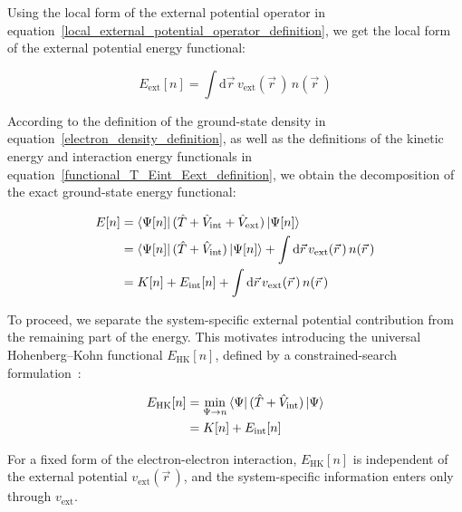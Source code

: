 Using the local form of the external potential operator in equation~\eqref{local_external_potential_operator_definition}, we get the local form of the external potential energy functional:

\begin{equation}
    E_\mathrm{ext}[n]=\int\mathrm{d}\vec{r}\,v_\mathrm{ext}(\vec{r}\,)\,n(\vec{r}\,)
\label{functional_Eext_local_form}
\end{equation}

According to the definition of the ground-state density in equation~\eqref{electron_density_definition},
as well as the definitions of the kinetic energy and interaction energy functionals in equation~\eqref{functional_T_Eint_Eext_definition},
we obtain the decomposition of the exact ground-state energy functional:

\begin{equation}
\begin{aligned}
E[n]
&= \bra{\Psi[n]}(\hat{T}+\hat{V}_\mathrm{int}+\hat{V}_\mathrm{ext})\ket{\Psi[n]} \\
&= \bra{\Psi[n]}(\hat{T}+\hat{V}_\mathrm{int})\ket{\Psi[n]}
 + \int\mathrm{d}\vec{r}\,v_\mathrm{ext}(\vec{r}\,)\,n(\vec{r}\,) \\
&= K[n]+E_\mathrm{int}[n]+\int\mathrm{d}\vec{r}\,v_\mathrm{ext}(\vec{r}\,)\,n(\vec{r}\,)
\end{aligned}
\label{energy_density_functional_decomposition}
\end{equation}

To proceed, we separate the system-specific external potential contribution from the remaining part of the energy.
This motivates introducing the universal Hohenberg--Kohn functional $E_\mathrm{HK}[n]$, defined by a constrained-search formulation~\cite{levy1979universal,engel2011density}:

\begin{equation}
\begin{aligned}
    E_\mathrm{HK}[n]
    &= \min_{\Psi\to n}\bra{\Psi}(\hat{T}+\hat{V}_\mathrm{int})\ket{\Psi} \\
    &= K[n] + E_\mathrm{int}[n]
\end{aligned}
\label{functional_HK_definition}
\end{equation}

For a fixed form of the electron-electron interaction, $E_\mathrm{HK}[n]$ is independent of the external potential $v_\mathrm{ext}(\vec{r}\,)$,
and the system-specific information enters only through $v_\mathrm{ext}$.

